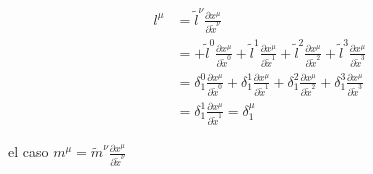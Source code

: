 \begin{enumerate}[1]
          \begin{equation}
            \begin{aligned}
                l^\mu&=\tilde{l}^\nu \frac{\partial x^\mu}{\partial \tilde{x}^\nu}\\
&  = + \tilde{l}^0 \frac{\partial x^\mu}{\partial \tilde{x}^0}+ \tilde{l}^1 \frac{\partial x^\mu}{\partial \tilde{x}^1} + \tilde{l}^2 \frac{\partial x^\mu}{\partial \tilde{x}^2} + \tilde{l}^3 \frac{\partial x^\mu}{\partial \tilde{x}^3} \\
& = \delta_1^0 \frac{\partial x^\mu }{\partial \tilde{x}^0} + \delta_1^1 \frac{\partial x^\mu }{\partial \tilde{x}^1} + \delta_1^2 \frac{\partial x^\mu }{\partial \tilde{x}^2} + \delta_1^3 \frac{\partial x^\mu }{\partial \tilde{x}^3}\\
&= \delta_1^1 \frac{\partial x^\mu }{\partial \tilde{x}^1} = \delta_1^\mu
            \end{aligned}
          \end{equation}

el caso $m^\mu=\tilde{m}^\nu \frac{\partial x^\mu}{\partial \tilde{x}^\nu}$


\end{enumerate}
